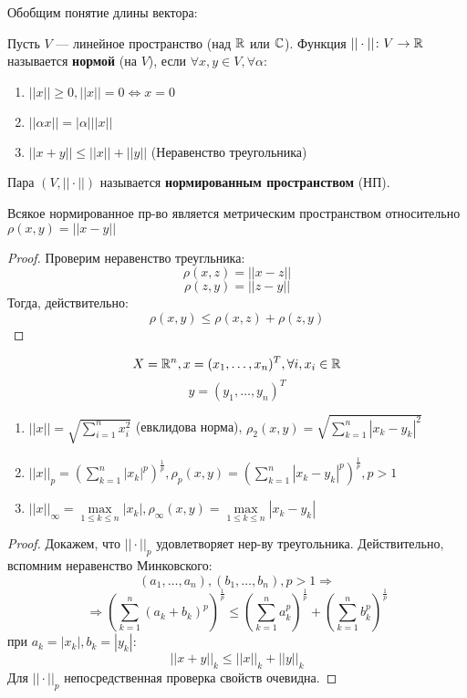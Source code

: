 Обобщим понятие длины вектора:
\begin{definition}
    Пусть $V$ --- линейное пространство (над $\mathbb{R}$ или $\mathbb{C}$). Функция $||\cdot|| \colon V \rightarrow \mathbb{R}$ называется \textbf{нормой} (на $V$), если $\forall x, y \in V, \forall \alpha$:
    \begin{enumerate}
        \item $||x|| \geq 0, ||x|| = 0 \iff x = 0$
        \item $||\alpha x|| = \left|\alpha\right| ||x||$
        \item $||x + y|| \leq ||x|| + ||y||$ (Неравенство треугольника)
    \end{enumerate}
    Пара $(V, ||\cdot||)$ называется \textbf{нормированным пространством} (НП).
\end{definition}
\begin{lemma}
    Всякое нормированное пр-во является метрическим пространством относительно $\rho(x, y) = ||x - y||$
\end{lemma}
\begin{proof}
    Проверим неравенство треугльника:
    \[
    \rho(x, z) = ||x - z||
    \]
    \[
    \rho(z, y) = ||z - y||
    \]
    Тогда, действительно:
    \[
    \rho(x, y) \leq \rho(x, z) + \rho(z, y)
    \]
\end{proof}
\begin{example}
    \[
    X = \mathbb{R}^{n}, x = (x_1, \ldots, x_n)^{T}, \forall i, x_i \in \mathbb{R}
    \]
    \[
    y = (y_1, \ldots, y_n)^{T}
    \]
    \begin{enumerate}
        \item $||x|| = \sqrt{\sum_{i = 1}^{n} x_i^{2}}$ (евклидова норма), $\rho_2(x, y) = \sqrt{\sum_{k = 1}^{n} \left|x_k - y_k\right|^{2}}$
        \item $||x||_p = \left(\sum_{k = 1}^{n} |x_k|^{p}\right)^{\frac{1}{p}}, \rho_p(x, y) = \left(\sum_{k = 1}^{n} \left|x_k - y_k\right|^{p}\right)^{\frac{1}{p}}, p > 1$
        \item $||x||_{\infty} = \underset{1 \leq k \leq n}{\max} \left|x_k\right|, \rho_{\infty}(x, y) = \underset{1 \leq k \leq n}{\max} |x_k - y_k|$ 
    \end{enumerate}
\end{example}
\begin{proof}
    Докажем, что $||\cdot||_p$ удовлетворяет нер-ву треугольника. Действительно, вспомним неравенство Минковского:
    \[
        (a_1, \ldots, a_n), (b_1, \ldots, b_n), p > 1 \Rightarrow
    \]
    \[
        \Rightarrow \left(\sum_{k = 1}^{n} (a_k + b_k)^{p}\right)^{\frac{1}{p}} \leq \left(\sum_{k = 1}^{n} a_k^{p}\right)^{\frac{1}{p}} + \left(\sum_{k = 1}^{n} b_k^{p}\right)^{\frac{1}{p}}
    \] 
    при $a_k = \left|x_k\right|, b_k = \left|y_k\right|$:
    \[
    ||x + y||_k \leq ||x||_k + ||y||_k
    \]
    Для $||\cdot||_p$ непосредственная проверка свойств очевидна.
\end{proof}

